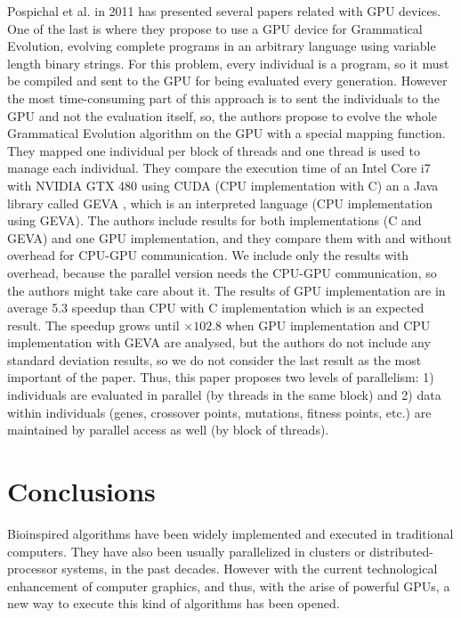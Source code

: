 \documentclass[review]{elsarticle}
\begin{document}
Pospichal et al. in 2011 has presented several papers related with GPU devices. One of the last is \cite{DBLP:conf/gecco/PospichalMOSJ11} where they propose to use a GPU device for Grammatical Evolution, evolving complete programs in an arbitrary language using variable length binary strings. For this problem, every individual is a program, so it must be compiled and sent to the GPU for being evaluated every generation. However the most time-consuming part of this approach is to sent the individuals to the GPU and not the evaluation itself, so, the authors propose to evolve the whole Grammatical Evolution algorithm on the GPU with a special mapping function. They mapped one individual per block of threads and one thread is used to manage each individual. They compare the execution time of an Intel Core i7 with NVIDIA GTX 480 using CUDA (CPU implementation with C) an a Java library called GEVA \cite{O'Neill:2008:GGE:1527063.1527066}, which is an interpreted language (CPU implementation using GEVA).  The authors include results for both implementations (C and GEVA) and one GPU implementation, and they compare them with and without overhead for CPU-GPU communication. We include only the results with overhead, because the parallel version needs the CPU-GPU communication, so the authors might take care about it. The results of GPU implementation are in average 5.3 speedup than CPU with C implementation which is an expected result. The speedup grows until $\times102.8$ when GPU implementation and CPU implementation with GEVA are analysed, but the authors do not include any standard deviation results, so we do not consider the last result as the most important of the paper. Thus, this paper proposes two levels of parallelism: 1) individuals are evaluated in parallel (by threads in the same block) and 2) data within individuals (genes, crossover points, mutations, fitness points, etc.) are maintained by parallel access as well (by block of threads).


\section{Conclusions}
\label{sec:conclusions}

Bioinspired algorithms have been widely implemented and executed in traditional computers. They have also been usually parallelized in clusters or distributed-processor systems, in the past decades. However with the current technological enhancement of computer graphics, and thus, with the arise of powerful GPUs, a new way to execute this kind of algorithms has been opened.
\end{document}
